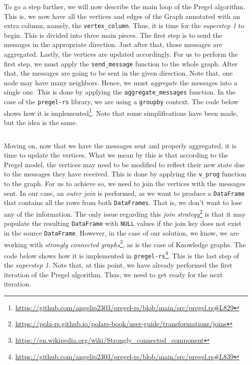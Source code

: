 \begin{code}
    \inputminted{rust}{code/listings/11-4_initial.rs}
\end{code}

To go a step further, we will now describe the main loop of the Pregel algorithm. This is, we now have all the vertices and edges of the Graph annotated with an extra column, namely, the \texttt{vertex\_column}. Thus, it is time for the \textit{superstep 1} to begin. This is divided into three main pieces. The first step is to send the messages in the appropriate direction. Just after that, those messages are aggregated. Lastly, the vertices are updated accordingly. For us to perform the first step, we must apply the \texttt{send\_message} function to the whole graph. After that, the messages are going to be sent in the given direction. Note that, one node may have many neighbors. Hence, we must \textit{aggregate} the messages into a single one. This is done by applying the \texttt{aggregate\_messages} function. In the case of the \texttt{pregel-rs} library, we are using a \texttt{groupby} context. The code below shows how it is implemented\footnote{\url{https://github.com/angelip2303/pregel-rs/blob/main/src/pregel.rs\#L829}}. Note that some simplifications have been made, but the idea is the same.

\begin{code}
    \inputminted{rust}{code/listings/11-5_msgs.rs}
\end{code}

Moving on, now that we have the messages sent and properly aggregated, it is time to update the vertices. What we mean by this is that according to the Pregel model, the vertices may need to be modified to reflect their new state due to the messages they have received. This is done by applying the \texttt{v\_prog} function to the graph. For us to achieve so, we need to join the vertices with the messages sent. In our case, an \textit{outer join} is performed, as we want to produce a \texttt{DataFrame} that contains all the rows from both \texttt{DataFrames}. That is, we don't want to lose any of the information. The only issue regarding this \textit{join strategy}\footnote{\url{https://pola-rs.github.io/polars-book/user-guide/transformations/joins}} is that it may populate the resulting \texttt{DataFrame} with \texttt{NULL} values if the join key does not exist in the source \texttt{DataFrame}. However, in the case of our solution, we know, we are working with \textit{strongly connected graphs}\footnote{\url{https://en.wikipedia.org/wiki/Strongly\_connected\_component}}, as is the case of Knowledge graphs. The code below shows how it is implemented in \texttt{pregel-rs}\footnote{\url{https://github.com/angelip2303/pregel-rs/blob/main/src/pregel.rs\#L839}}. This is the last step of the \textit{superstep 1}. Note that, at this point, we have already performed the first iteration of the Pregel algorithm. Thus, we need to get ready for the next iteration.

